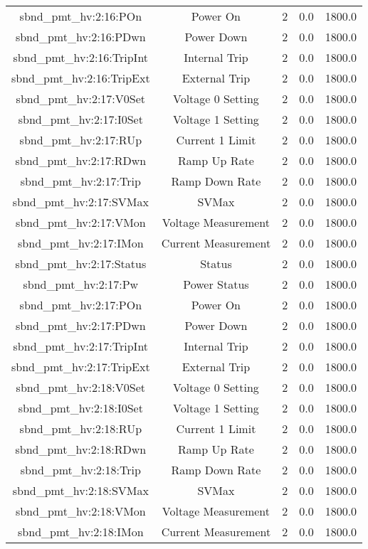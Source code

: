 \begin{table}[ptb]
\begin{tabular}{c | c c c c}
sbnd_pmt_hv:2:16:POn & Power On & 2 & 0.0 & 1800.0\\ 
sbnd_pmt_hv:2:16:PDwn & Power Down & 2 & 0.0 & 1800.0\\ 
sbnd_pmt_hv:2:16:TripInt & Internal Trip & 2 & 0.0 & 1800.0\\ 
sbnd_pmt_hv:2:16:TripExt & External Trip & 2 & 0.0 & 1800.0\\ 
sbnd_pmt_hv:2:17:V0Set & Voltage 0 Setting & 2 & 0.0 & 1800.0\\ 
sbnd_pmt_hv:2:17:I0Set & Voltage 1 Setting & 2 & 0.0 & 1800.0\\ 
sbnd_pmt_hv:2:17:RUp & Current 1 Limit & 2 & 0.0 & 1800.0\\ 
sbnd_pmt_hv:2:17:RDwn & Ramp Up Rate & 2 & 0.0 & 1800.0\\ 
sbnd_pmt_hv:2:17:Trip & Ramp Down Rate & 2 & 0.0 & 1800.0\\ 
sbnd_pmt_hv:2:17:SVMax & SVMax & 2 & 0.0 & 1800.0\\ 
sbnd_pmt_hv:2:17:VMon & Voltage Measurement & 2 & 0.0 & 1800.0\\ 
sbnd_pmt_hv:2:17:IMon & Current Measurement & 2 & 0.0 & 1800.0\\ 
sbnd_pmt_hv:2:17:Status & Status & 2 & 0.0 & 1800.0\\ 
sbnd_pmt_hv:2:17:Pw & Power Status & 2 & 0.0 & 1800.0\\ 
sbnd_pmt_hv:2:17:POn & Power On & 2 & 0.0 & 1800.0\\ 
sbnd_pmt_hv:2:17:PDwn & Power Down & 2 & 0.0 & 1800.0\\ 
sbnd_pmt_hv:2:17:TripInt & Internal Trip & 2 & 0.0 & 1800.0\\ 
sbnd_pmt_hv:2:17:TripExt & External Trip & 2 & 0.0 & 1800.0\\ 
sbnd_pmt_hv:2:18:V0Set & Voltage 0 Setting & 2 & 0.0 & 1800.0\\ 
sbnd_pmt_hv:2:18:I0Set & Voltage 1 Setting & 2 & 0.0 & 1800.0\\ 
sbnd_pmt_hv:2:18:RUp & Current 1 Limit & 2 & 0.0 & 1800.0\\ 
sbnd_pmt_hv:2:18:RDwn & Ramp Up Rate & 2 & 0.0 & 1800.0\\ 
sbnd_pmt_hv:2:18:Trip & Ramp Down Rate & 2 & 0.0 & 1800.0\\ 
sbnd_pmt_hv:2:18:SVMax & SVMax & 2 & 0.0 & 1800.0\\ 
sbnd_pmt_hv:2:18:VMon & Voltage Measurement & 2 & 0.0 & 1800.0\\ 
sbnd_pmt_hv:2:18:IMon & Current Measurement & 2 & 0.0 & 1800.0\\ 

\end{tabular}
\end{table}
